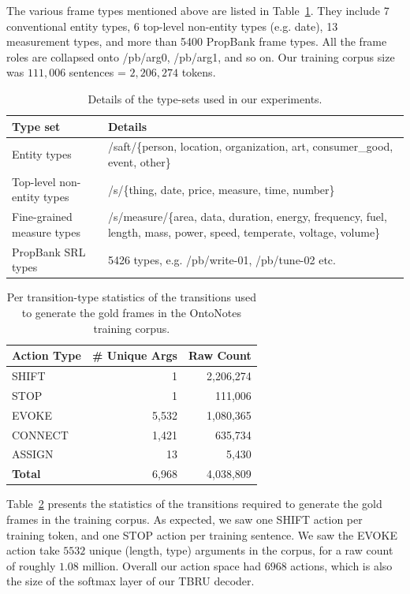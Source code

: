 \documentclass[11pt,a4paper]{article}
\begin{document}
The various frame types mentioned above are listed in
Table~\ref{tab:types}. They include 7 conventional entity types,
6 top-level non-entity types (e.g. date), 13 measurement types, and
more than 5400 PropBank frame types. All the frame roles are collapsed onto
/pb/arg0, /pb/arg1, and so on. Our training corpus size was $111,006$
sentences = $2,206,274$ tokens.

\begin{table}[t]
\begin{tabular}{|l|p{11cm}|}
\hline
{\bf Type set} & {\bf Details} \\
\hline
Entity types & /saft/\{person, location, organization, art, consumer\_good, event, other\} \\
\hline
Top-level non-entity types & /s/\{thing, date, price, measure, time, number\} \\
\hline
Fine-grained measure types & /s/measure/\{area, data, duration, energy, frequency, fuel, length, mass, power, speed, temperate, voltage, volume\} \\
\hline
PropBank SRL types & 5426 types, e.g. /pb/write-01, /pb/tune-02 etc.  \\
\hline
\end{tabular}
\caption{Details of the type-sets used in our experiments.}
\label{tab:types}
\end{table}

\begin{table}[t]
\begin{tabular}{|l|r|r|}
\hline
{\bf Action Type} & {\bf \# Unique Args} & {\bf Raw Count} \\
\hline
SHIFT & 1 & 2,206,274 \\
\hline
STOP & 1 & 111,006 \\
\hline
EVOKE & 5,532 & 1,080,365 \\
\hline
CONNECT & 1,421 & 635,734 \\
\hline
ASSIGN & 13 & 5,430 \\
\hline
{\bf Total} & 6,968 & 4,038,809 \\
\hline
\end{tabular}
\caption{Per transition-type statistics of the transitions used to generate
the gold frames in the OntoNotes training corpus.}
\label{tab:action-table}
\end{table}

Table~\ref{tab:action-table} presents the statistics of the transitions required
to generate the gold frames in the training corpus. As expected, we saw one
SHIFT action per training token, and one STOP action per training sentence.
We saw the EVOKE action take $5532$ unique (length, type) arguments in the
corpus, for a raw count of roughly $1.08$ million. Overall our action space
had $6968$ actions, which is also the size of the softmax layer of our TBRU
decoder.
\end{document}
